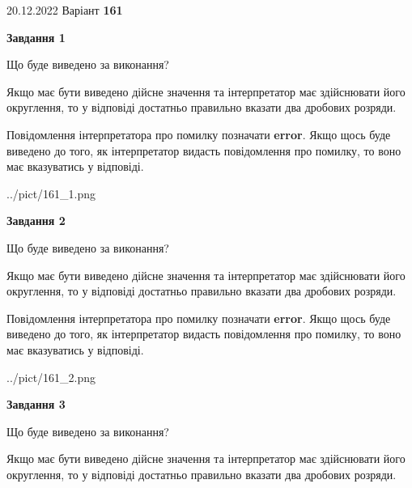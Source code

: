 \documentclass[12pt, ukrainian]{article}
\begin{document}
{20.12.2022 Варіант \No \textbf { 161 }\par}
{
\begin {Large}

{\begin {center}\textbf{Завдання 1}\end {center}}\par
Що буде виведено за виконання? \par

Якщо має бути виведено дійсне значення та інтерпретатор має здійснювати його округлення, 
то у відповіді достатньо правильно вказати два дробових розряди.

Повідомлення інтерпретатора про помилку позначати \textbf{error}.
Якщо щось буде виведено до того, як інтерпретатор видасть повідомлення про помилку, 
то воно має вказуватись у відповіді. \par

\begin{center}
	{../pict/161_1.png}
\end{center}
\newpage

{\begin {center}\textbf{Завдання 2}\end {center}}\par
Що буде виведено за виконання? \par

Якщо має бути виведено дійсне значення та інтерпретатор має здійснювати його округлення, 
то у відповіді достатньо правильно вказати два дробових розряди.

Повідомлення інтерпретатора про помилку позначати \textbf{error}.
Якщо щось буде виведено до того, як інтерпретатор видасть повідомлення про помилку, 
то воно має вказуватись у відповіді. \par

\begin{center}
	{../pict/161_2.png}
\end{center}
\newpage

{\begin {center}\textbf{Завдання 3}\end {center}}\par
Що буде виведено за виконання? \par

Якщо має бути виведено дійсне значення та інтерпретатор має здійснювати його округлення, 
то у відповіді достатньо правильно вказати два дробових розряди.


\end{Large}}
\end{document}
